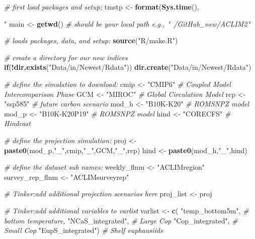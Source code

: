 \documentclass[
]{article}
\newenvironment{Shaded}{\begin{snugshade}}{\end{snugshade}}
\newcommand{\CommentTok}[1]{\textcolor[rgb]{0.56,0.35,0.01}{\textit{#1}}}
\newcommand{\ControlFlowTok}[1]{\textcolor[rgb]{0.13,0.29,0.53}{\textbf{#1}}}
\newcommand{\KeywordTok}[1]{\textcolor[rgb]{0.13,0.29,0.53}{\textbf{#1}}}
\newcommand{\NormalTok}[1]{#1}
\newcommand{\OperatorTok}[1]{\textcolor[rgb]{0.81,0.36,0.00}{\textbf{#1}}}
\newcommand{\StringTok}[1]{\textcolor[rgb]{0.31,0.60,0.02}{#1}}
\begin{document}
\begin{Shaded}
\begin{Highlighting}[]
    \CommentTok{# first load packages and setup:}
\NormalTok{    tmstp  <-}\StringTok{ }\KeywordTok{format}\NormalTok{(}\KeywordTok{Sys.time}\NormalTok{(), }\StringTok{"%
\NormalTok{    main   <-}\StringTok{ }\KeywordTok{getwd}\NormalTok{()    }\CommentTok{# should be your local path e.g., "~/GitHub_new/ACLIM2"}
    
    \CommentTok{# loads packages, data, and setup:}
    \KeywordTok{source}\NormalTok{(}\StringTok{"R/make.R"}\NormalTok{) }
    
    \CommentTok{# create a directory for our new indices }
    \ControlFlowTok{if}\NormalTok{(}\OperatorTok{!}\KeywordTok{dir.exists}\NormalTok{(}\StringTok{"Data/in/Newest/Rdata"}\NormalTok{)) }\KeywordTok{dir.create}\NormalTok{(}\StringTok{"Data/in/Newest/Rdata"}\NormalTok{)}
    
    \CommentTok{# define the simulation to download:}
\NormalTok{    cmip <-}\StringTok{ "CMIP6"}     \CommentTok{# Coupled Model Intercomparison Phase}
\NormalTok{    GCM  <-}\StringTok{ "MIROC"}     \CommentTok{# Global Circulation Model}
\NormalTok{    rcp  <-}\StringTok{ "ssp585"}     \CommentTok{# future carbon scenario}
\NormalTok{    mod_h  <-}\StringTok{ "B10K-K20"}  \CommentTok{# ROMSNPZ model}
\NormalTok{    mod_p  <-}\StringTok{ "B10K-K20P19"}  \CommentTok{# ROMSNPZ model}
\NormalTok{    hind <-}\StringTok{ "CORECFS"}   \CommentTok{# Hindcast}
    
    \CommentTok{# define the projection simulation:}
\NormalTok{    proj  <-}\StringTok{ }\KeywordTok{paste0}\NormalTok{(mod_p,}\StringTok{"_"}\NormalTok{,cmip,}\StringTok{"_"}\NormalTok{,GCM,}\StringTok{"_"}\NormalTok{,rcp)}
\NormalTok{    hind  <-}\StringTok{ }\KeywordTok{paste0}\NormalTok{(mod_h,}\StringTok{"_"}\NormalTok{,hind)}
    
    \CommentTok{# define the dataset sub names:   }
\NormalTok{    weekly_flnm     <-}\StringTok{ "ACLIMregion"}
\NormalTok{    survey_rep_flnm <-}\StringTok{ "ACLIMsurveyrep"}
    
    \CommentTok{# Tinker:add additional projection scenarios here}
\NormalTok{    proj_list       <-}\StringTok{ }\NormalTok{proj    }

    
    \CommentTok{# Tinker:add additional variables to varlist}
\NormalTok{    varlist         <-}\StringTok{ }\KeywordTok{c}\NormalTok{(}
                          \StringTok{"temp_bottom5m"}\NormalTok{,    }\CommentTok{# bottom temperature,}
                          \StringTok{"NCaS_integrated"}\NormalTok{,  }\CommentTok{# Large Cop}
                          \StringTok{"Cop_integrated"}\NormalTok{,   }\CommentTok{# Small Cop}
                          \StringTok{"EupS_integrated"}\NormalTok{)  }\CommentTok{# Shelf  euphausiids}
    
}
\end{Highlighting}
\end{Shaded}
\end{document}
